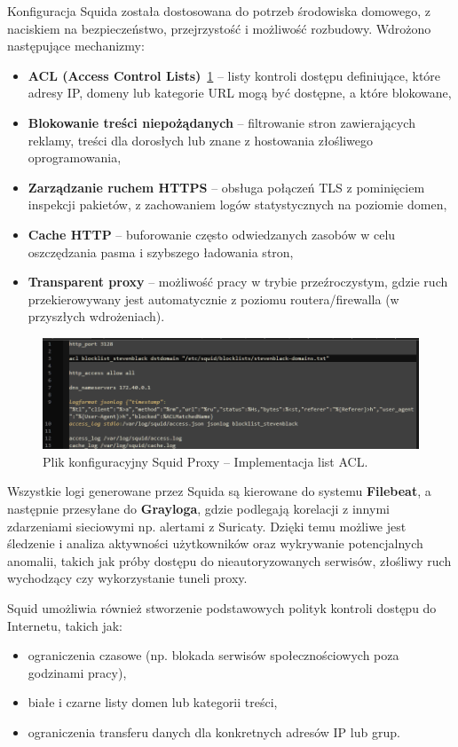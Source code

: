\documentclass[
    left=2.5cm,         %
    right=2.5cm,        %
    top=2.5cm,          %
    bottom=3cm,         %
    bindingoffset=6mm,  %
    nohyphenation=true %
]{eiti/eiti-thesis} %
\begin{document}
Konfiguracja Squida została dostosowana do potrzeb środowiska domowego, z naciskiem na bezpieczeństwo, przejrzystość i możliwość rozbudowy. Wdrożono następujące mechanizmy:
\begin{itemize}
    \item \textbf{ACL (Access Control Lists)}~\ref{fig:squid-acl} – listy kontroli dostępu definiujące, które adresy IP, domeny lub kategorie URL mogą być dostępne, a które blokowane,
    \item \textbf{Blokowanie treści niepożądanych} – filtrowanie stron zawierających reklamy, treści dla dorosłych lub znane z hostowania złośliwego oprogramowania,
    \item \textbf{Zarządzanie ruchem HTTPS} – obsługa połączeń TLS z pominięciem inspekcji pakietów, z zachowaniem logów statystycznych na poziomie domen,
    \item \textbf{Cache HTTP} – buforowanie często odwiedzanych zasobów w celu oszczędzania pasma i szybszego ładowania stron,
    \item \textbf{Transparent proxy} – możliwość pracy w trybie przeźroczystym, gdzie ruch przekierowywany jest automatycznie z poziomu routera/firewalla (w przyszłych wdrożeniach).
\end{itemize}

\begin{figure}[H]
    \centering
    \includegraphics[width=\textwidth]{img/squid-acl.png}
    \caption{Plik konfiguracyjny Squid Proxy – Implementacja list ACL.}
    \label{fig:squid-acl}
\end{figure}

Wszystkie logi generowane przez Squida są kierowane do systemu \textbf{Filebeat}, a następnie przesyłane do \textbf{Grayloga}, gdzie podlegają korelacji z innymi zdarzeniami sieciowymi np. alertami z Suricaty. Dzięki temu możliwe jest śledzenie i analiza aktywności użytkowników oraz wykrywanie potencjalnych anomalii, takich jak próby dostępu do nieautoryzowanych serwisów, złośliwy ruch wychodzący czy wykorzystanie tuneli proxy.

Squid umożliwia również stworzenie podstawowych polityk kontroli dostępu do Internetu, takich jak:
\begin{itemize}
    \item ograniczenia czasowe (np. blokada serwisów społecznościowych poza godzinami pracy),
    \item białe i czarne listy domen lub kategorii treści,
    \item ograniczenia transferu danych dla konkretnych adresów IP lub grup.
\end{itemize}
\end{document}
